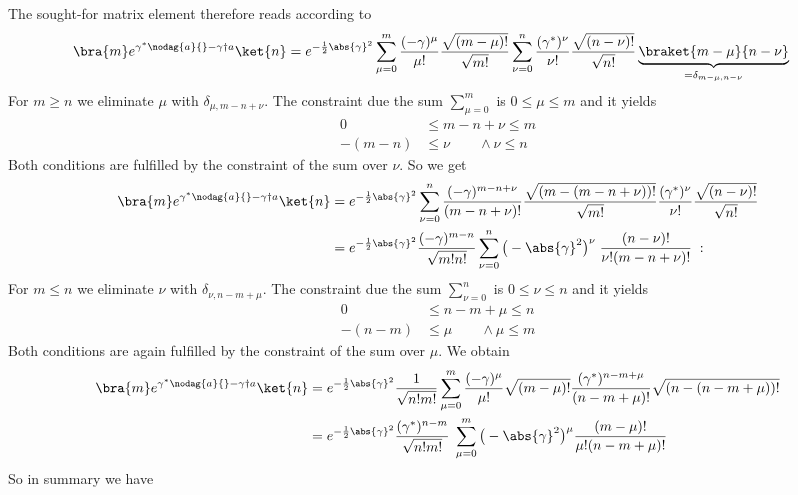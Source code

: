 The sought-for matrix element therefore reads according to 
%
\begin{align*}
\bra{m} e^{\gamma^{*}\nodag{a}{}-\gamma\dag{a}{}} \ket{n} &=
e^{-\frac{1}{2}\abs{\gamma}^{2}}
\sum_{\mu=0}^{m} \frac{(-\gamma)^{\mu}}{\mu!}
\frac{\sqrt{(m-\mu)!}}{\sqrt{m!}} 
\sum_{\nu=0}^{n} \frac{(\gamma^{*})^{\nu}}{\nu!}
\frac{\sqrt{(n-\nu)!}}{\sqrt{n!}} \underbrace{\braket{m-\mu}{n-\nu}}_{=\delta_{m-\mu,n-\nu}}
\end{align*}
%
For $m\ge n$ we eliminate $\mu$ with $\delta_{\mu,m-n+\nu}$. The
constraint due the sum $\sum_{\mu=0}^{m}$ is $0\le \mu\le m$ and it yields
%
\begin{align*}
0&\le m-n+\nu \le m\\
-(m-n)&\le \nu\qquad \wedge \nu\le n
\end{align*}
Both conditions are fulfilled by the constraint of the sum over $\nu$. So we get
%
\begin{align*}
\bra{m} e^{\gamma^{*}\nodag{a}{}-\gamma\dag{a}{}} \ket{n} &=
e^{-\frac{1}{2}\abs{\gamma}^{2}}
\sum_{\nu=0}^{n}  \frac{(-\gamma)^{m-n+\nu}}{(m-n+\nu)!}
\frac{\sqrt{(m-(m-n+\nu))!}}{\sqrt{m!}} 
 \frac{(\gamma^{*})^{\nu}}{\nu!}
\frac{\sqrt{(n-\nu)!}}{\sqrt{n!}} \\
&=e^{-\frac{1}{2}\abs{\gamma}^{2}}
\frac{(-\gamma)^{m-n}}{\sqrt{m!n!}}
\sum_{\nu=0}^{n} \big(-\abs{\gamma}^{2}\big)^{\nu}\;
 \frac{(n-\nu)! 
 }{\nu!(m-n+\nu)!}
\;:
\end{align*}
For $m\le n$ we eliminate $\nu$ with $\delta_{\nu,n-m+\mu}$. The
constraint due the sum $\sum_{\nu=0}^{n}$ is $0\le \nu\le n$ and it yields
%
\begin{align*}
0&\le n-m+\mu \le n\\
-(n-m)&\le \mu\qquad \wedge \mu\le m
\end{align*}
Both conditions are again fulfilled by the constraint of the sum over $\mu$. 
We obtain
%
\begin{align*}
\bra{m} e^{\gamma^{*}\nodag{a}{}-\gamma\dag{a}{}} \ket{n} 
&=e^{-\frac{1}{2}\abs{\gamma}^{2}}\frac{1}{\sqrt{n! m!}}
\sum_{\mu=0}^{m} \frac{(-\gamma)^{\mu}}{\mu!}
\sqrt{(m-\mu)!}
\frac{(\gamma^{*})^{n-m+\mu}}{(n-m+\mu)!}
\sqrt{(n-(n-m+\mu))!}\\
&=e^{-\frac{1}{2}\abs{\gamma}^{2}}\frac{(\gamma^{*})^{n-m}}{\sqrt{n! m!}}\;
\sum_{\mu=0}^{m} \big(-\abs{\gamma}^{2}\big)^{\mu}
\frac{(m-\mu)!}{\mu!(n-m+\mu)!}
\end{align*}
%
So in summary we have

